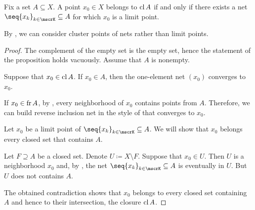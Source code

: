 \begin{proposition}\label{thm:limit_point_iff_in_closure}
  Fix a set \( A \subseteq X \). A point \( x_0 \in X \) belongs to \( \operatorname{cl}{A} \) if and only if there exists a net \( \seq{ x_k }_{k \in \mscrK} \subseteq A \) for which \( x_0 \) is a limit point.

  By , we can consider cluster points of nets rather than limit points.
\end{proposition}
\begin{proof}
  The complement of the empty set is the empty set, hence the statement of the proposition holds vacuously. Assume that \( A \) is nonempty.

  \SufficiencySubProof Suppose that \( x_0 \in \operatorname{cl}{A} \). If \( x_0 \in A \), then the one-element net \( (x_0) \) converges to \( x_0 \).

  If \( x_0 \in \operatorname{fr}{A} \), by , every neighborhood of \( x_0 \) contains points from \( A \). Therefore, we can build reverse inclusion net in the style of  that converges to \( x_0 \).

  \NecessitySubProof Let \( x_0 \) be a limit point of \( \seq{ x_k }_{k \in \mscrK} \subseteq A \). We will show that \( x_0 \) belongs every closed set that contains \( A \).

  Let \( F \supseteq A \) be a closed set. Denote \( U \coloneqq X \setminus F \). Suppose that \( x_0 \in U \). Then \( U \) is a neighborhood \( x_0 \) and, by , the net \( \seq{ x_k }_{k \in \mscrK} \subseteq A \) is eventually in \( U \). But \( U \) does not contains \( A \).

  The obtained contradiction shows that \( x_0 \) belongs to every closed set containing \( A \) and hence to their intersection, the closure \( \operatorname{cl} A \).
\end{proof}

